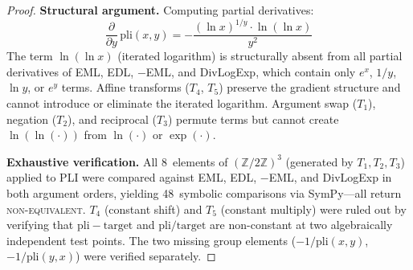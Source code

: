 \documentclass[10pt,twocolumn]{article}
\theoremstyle{remark}
\begin{document}
\begin{proof}
\textbf{Structural argument.} Computing partial derivatives:
\[
\frac{\partial}{\partial y}\,\mathrm{pli}(x,y) = -\frac{(\ln x)^{1/y} \cdot \ln(\ln x)}{y^2}
\]
The term $\ln(\ln x)$ (iterated logarithm) is structurally absent from all partial derivatives of EML, EDL, $-$EML, and DivLogExp, which contain only $e^x$, $1/y$, $\ln y$, or $e^y$ terms. Affine transforms ($T_4$, $T_5$) preserve the gradient structure and cannot introduce or eliminate the iterated logarithm. Argument swap ($T_1$), negation ($T_2$), and reciprocal ($T_3$) permute terms but cannot create $\ln(\ln(\cdot))$ from $\ln(\cdot)$ or $\exp(\cdot)$.

\textbf{Exhaustive verification.} All 8~elements of $(\mathbb{Z}/2\mathbb{Z})^3$ (generated by $T_1, T_2, T_3$) applied to PLI were compared against EML, EDL, $-$EML, and DivLogExp in both argument orders, yielding 48~symbolic comparisons via SymPy---all return \textsc{non-equivalent}. $T_4$ (constant shift) and $T_5$ (constant multiply) were ruled out by verifying that $\mathrm{pli} - \mathrm{target}$ and $\mathrm{pli}/\mathrm{target}$ are non-constant at two algebraically independent test points. The two missing group elements ($-1/\mathrm{pli}(x,y)$, $-1/\mathrm{pli}(y,x)$) were verified separately.
\end{proof}
\end{document}
